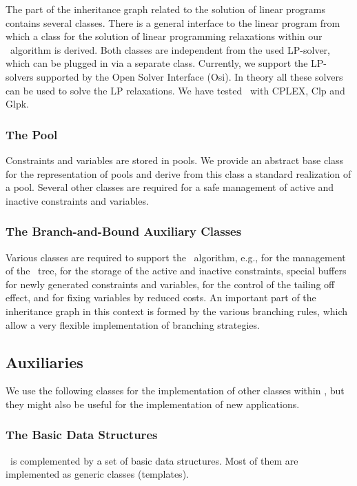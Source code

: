 The part of the inheritance graph related to the solution of linear programs
contains several classes. There is a general interface to the linear program
from which a class for the solution of linear programming relaxations
within our \bab\ algorithm is derived. Both classes are independent
from the used LP-solver, which can be plugged in via a separate class.
Currently, we support the LP-solvers supported by the Open Solver Interface
(Osi). In theory all these solvers can be used to solve the LP relaxations.
We have tested \ABACUS\ with CPLEX, Clp and Glpk.

\subsubsection{The Pool}

Constraints and variables are stored in pools. We provide an abstract
base class for the representation of pools and derive from this
class a standard realization of a pool. Several other classes are required
for a safe management of active and inactive constraints and variables.

\subsubsection{The Branch-and-Bound Auxiliary Classes}

Various classes are required to support the \lpbab\ algorithm, e.g., for
the management of the \bab\ tree, for the storage of the active and
inactive constraints, special buffers for newly generated constraints
and variables, for the control of the tailing off effect, and for fixing
variables by reduced costs. An important part of the
inheritance graph in this context is formed
by the various branching rules, which allow a very flexible implementation
of branching strategies.

\subsection{Auxiliaries}

We use the following classes for the implementation of other classes within
\ABACUS, but they might also be useful for the implementation of new
applications.

\subsubsection{The Basic Data Structures}
\noindent
\ABACUS\ is complemented by a set of basic data structures. Most of
them are implemented as generic classes (templates).

